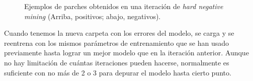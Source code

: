 \begin{figure}

  \caption{Ejemplos de parches obtenidos en una iteración de \textit{hard negative mining} (Arriba, positivos; abajo, negativos).}\label{fig:hnmit}
\end{figure}


Cuando tenemos la nueva carpeta con los errores del modelo, se carga y se reentrena con los mismos parámetros de entrenamiento que se han usado previamente hasta lograr un mejor modelo que en la iteración anterior. Aunque no hay limitación de cuántas iteraciones pueden hacerse, normalmente es suficiente con no más de 2 o 3 para depurar el modelo hasta cierto punto.

